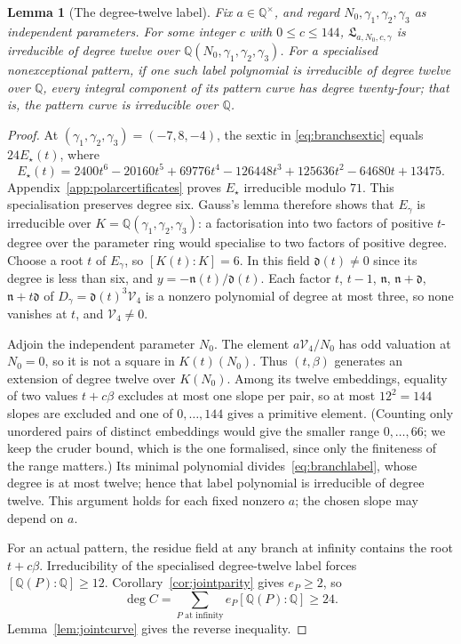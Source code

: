 \documentclass[11pt]{article}
\newtheorem{lemma}[theorem]{Lemma}
\theoremstyle{definition}
\theoremstyle{remark}
\begin{document}
\begin{lemma}[The degree-twelve label]\label{lem:branchlabel}
Fix $a\in\mathbb Q^\times$, and regard $N_0,\gamma_1,\gamma_2,\gamma_3$
as independent parameters. For some integer $c$ with $0\le c\le144$,
$\mathfrak L_{a,N_0,c,\gamma}$ is irreducible of degree twelve over
$\mathbb Q(N_0,\gamma_1,\gamma_2,\gamma_3)$.
For a specialised nonexceptional pattern, if one such label polynomial is
irreducible of degree twelve over $\mathbb Q$, every integral component of
its pattern curve has degree twenty-four; that is, the pattern curve is
irreducible over $\mathbb Q$.
\end{lemma}
\begin{proof}
At $(\gamma_1,\gamma_2,\gamma_3)=(-7,8,-4)$, the sextic in
\eqref{eq:branchsextic} equals $24E_\star(t)$, where
\[
 E_\star(t)=2400t^6-20160t^5+69776t^4-126448t^3
                  +125636t^2-64680t+13475.
\]
Appendix~\ref{app:polarcertificates} proves $E_\star$ irreducible modulo $71$.
This specialisation preserves degree six. Gauss's lemma therefore shows
that $E_\gamma$ is irreducible over
$K=\mathbb Q(\gamma_1,\gamma_2,\gamma_3)$: a factorisation into two factors of positive $t$-degree over the
parameter ring would specialise to two factors of positive degree.
Choose a root $t$ of $E_\gamma$, so $[K(t):K]=6$.
In this field $\mathfrak d(t)\ne0$ since its degree is less than six, and
$y=-\mathfrak n(t)/\mathfrak d(t)$. Each factor $t$, $t-1$, $\mathfrak n$,
$\mathfrak n+\mathfrak d$, $\mathfrak n+t\mathfrak d$ of
$D_\gamma=\mathfrak d(t)^3\mathcal V_4$ is a nonzero polynomial of degree at most
three, so none vanishes at $t$, and $\mathcal V_4\ne0$.

Adjoin the independent parameter $N_0$. The element $a\mathcal V_4/N_0$ has
odd valuation at $N_0=0$, so it is not a square in $K(t)(N_0)$.
Thus $(t,\beta)$ generates an extension of degree twelve over $K(N_0)$.
Among its twelve embeddings, equality of two values $t+c\beta$ excludes
at most one slope per pair, so at most $12^2=144$ slopes are excluded and one of
$0,\dots,144$ gives a primitive element. (Counting only unordered pairs of distinct
embeddings would give the smaller range $0,\dots,66$; we keep the cruder bound, which is the
one formalised, since only the finiteness of the range matters.) Its minimal polynomial divides~\eqref{eq:branchlabel},
whose degree is at most twelve; hence that label polynomial is irreducible
of degree twelve. This argument holds for each fixed nonzero $a$; the
chosen slope may depend on $a$.

For an actual pattern, the residue field at any branch at infinity contains
the root $t+c\beta$. Irreducibility of the specialised degree-twelve label
forces $[\mathbb Q(P):\mathbb Q]\ge12$.
Corollary~\ref{cor:jointparity} gives $e_P\ge2$, so
\[
 \deg C=\sum_{P\text{ at infinity}}e_P[\mathbb Q(P):\mathbb Q]\ge24.
\]
Lemma~\ref{lem:jointcurve} gives the reverse inequality.
\end{proof}
\end{document}
